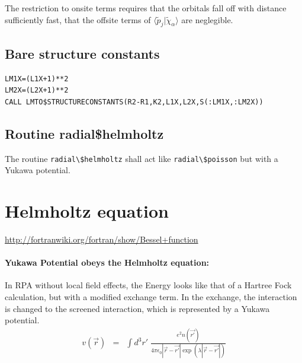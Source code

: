 \documentclass[11pt,a4paper]{report}
\begin{document}
The restriction to onsite terms requires that the orbitals fall off
with distance sufficiently fast, that the offsite terms of
$\langle\tilde{p}_j|\tilde\chi_\alpha\rangle$ are neglegible.

\subsection{Bare structure constants}

\begin{verbatim}
LM1X=(L1X+1)**2
LM2X=(L2X+1)**2
CALL LMTO$STRUCTURECONSTANTS(R2-R1,K2,L1X,L2X,S(:LM1X,:LM2X))
\end{verbatim}



\subsection{Routine radial\$helmholtz}
The routine \verb|radial\$helmholtz| shall act like
\verb|radial\$poisson| but with a Yukawa potential.



\newpage
\section{Helmholtz equation}



\url{http://fortranwiki.org/fortran/show/Bessel+function}

\paragraph{Yukawa Potential obeys the Helmholtz equation:}
In RPA without local field effects, the Energy looks like that of a
Hartree Fock calculation, but with a modified exchange term. In the
exchange, the interaction is changed to the screened interaction,
which is represented by a Yukawa potential.
\begin{eqnarray}
v(\vec{r})&=&
\int d^3r'\; \frac{e^2 n(\vec{r'})}
{4\pi\epsilon_0|\vec{r}-\vec{r'}|\exp(\lambda|\vec{r}-\vec{r'}|)}
\label{eq:screenedcoulomb}
\end{eqnarray}
\end{document}
